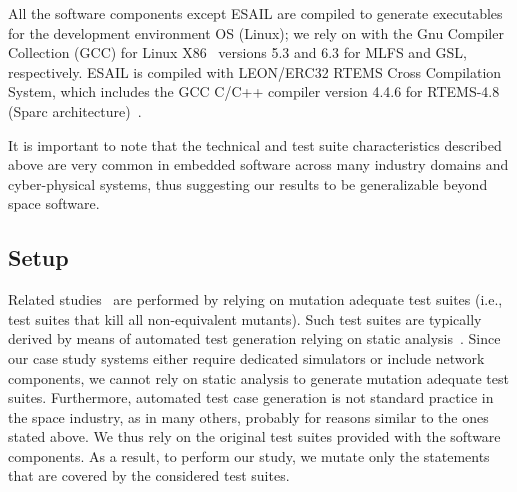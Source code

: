 All the software components except ESAIL are compiled to generate executables for the development environment OS (Linux); we rely on with the Gnu Compiler Collection (GCC)  for Linux X86~\cite{GCC} versions 5.3 and 6.3 for MLFS and GSL, respectively. ESAIL is compiled with 
LEON/ERC32 RTEMS Cross Compilation System, which includes the GCC C/C++ compiler version 4.4.6 for  RTEMS-4.8 (Sparc architecture)~\cite{RTEMS}.

It is important to note that the technical and test suite characteristics described above are very common in embedded software across many industry domains and cyber-physical systems, thus suggesting our results to be generalizable beyond space software. 







\subsection{Setup}
\label{experimnt:setup}


Related studies~\cite{zhang2010operator,zhang2013operator} are performed by relying on mutation adequate test suites (i.e., test suites that kill all non-equivalent mutants). 
Such test suites are typically derived by means of automated test generation relying on static analysis~\cite{papadakis2012mutation}.
Since our case study systems either require dedicated simulators or include network components, we cannot rely on static analysis to generate mutation adequate test suites. 
Furthermore, automated test case generation is not standard practice in the space industry, as in many others, probably for reasons similar to the ones stated above.
We thus rely on the original test suites provided with the software components. As a result, to perform our study, we mutate only the statements that are covered by the considered test suites.

